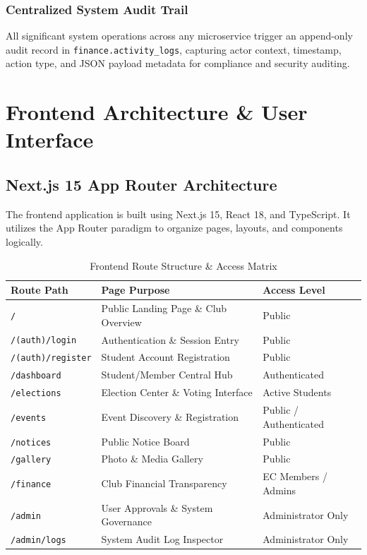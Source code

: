 \documentclass[12pt, a4paper]{report}
\begin{document}
\subsection{Centralized System Audit Trail}
All significant system operations across any microservice trigger an append-only audit record in \texttt{finance.activity\_logs}, capturing actor context, timestamp, action type, and JSON payload metadata for compliance and security auditing.

\chapter{Frontend Architecture \& User Interface}

\section{Next.js 15 App Router Architecture}
The frontend application is built using Next.js 15, React 18, and TypeScript. It utilizes the App Router paradigm to organize pages, layouts, and components logically.

\begin{table}[h!]
\centering
\caption{Frontend Route Structure \& Access Matrix}
\label{tab:frontend_routes}
\begin{tabular}{@{}lll@{}}
\toprule
\textbf{Route Path} & \textbf{Page Purpose} & \textbf{Access Level} \\ \midrule
\texttt{/} & Public Landing Page \& Club Overview & Public \\
\texttt{/(auth)/login} & Authentication \& Session Entry & Public \\
\texttt{/(auth)/register} & Student Account Registration & Public \\
\texttt{/dashboard} & Student/Member Central Hub & Authenticated \\
\texttt{/elections} & Election Center \& Voting Interface & Active Students \\
\texttt{/events} & Event Discovery \& Registration & Public / Authenticated \\
\texttt{/notices} & Public Notice Board & Public \\
\texttt{/gallery} & Photo \& Media Gallery & Public \\
\texttt{/finance} & Club Financial Transparency & EC Members / Admins \\
\texttt{/admin} & User Approvals \& System Governance & Administrator Only \\
\texttt{/admin/logs} & System Audit Log Inspector & Administrator Only \\ \bottomrule
\end{tabular}
\end{table}
\end{document}
